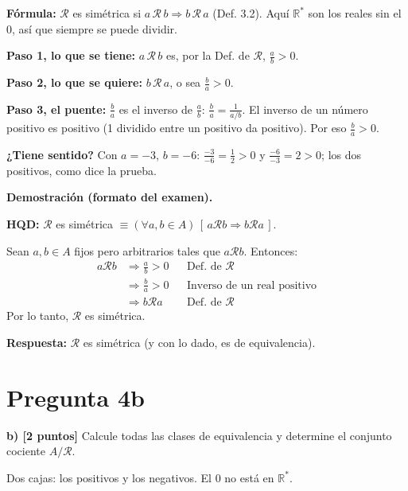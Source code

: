 \documentclass[11pt]{article}
\newcommand{\R}{\mathcal{R}}
\newcommand{\hl}[1]{\colorbox{green!35}{#1}}
\begin{document}
\begin{explica}
\textbf{Fórmula:} $\R$ es simétrica si $a\,\R\,b\Rightarrow b\,\R\,a$ (Def. 3.2). Aquí $\mathbb R^*$ son los reales sin el $0$, así que siempre se puede dividir.

\textbf{Paso 1, lo que se tiene:} $a\,\R\,b$ es, por la Def. de $\R$, $\frac ab>0$.

\textbf{Paso 2, lo que se quiere:} $b\,\R\,a$, o sea $\frac ba>0$.

\textbf{Paso 3, el puente:} $\frac ba$ es el inverso de $\frac ab$: $\frac ba=\frac{1}{a/b}$. El inverso de un número positivo es positivo (1 dividido entre un positivo da positivo). Por eso $\frac ba>0$.

\textbf{¿Tiene sentido?} Con $a=-3$, $b=-6$: $\frac{-3}{-6}=\frac12>0$ y $\frac{-6}{-3}=2>0$; los dos positivos, como dice la prueba.
\end{explica}

\textbf{Demostración (formato del examen).}

\textbf{HQD:} $\R$ es simétrica $\equiv(\forall a,b\in A)\,[\,a\R b\Rightarrow b\R a\,]$.

Sean $a,b\in A$ fijos pero arbitrarios tales que $a\R b$. Entonces:
\begin{align*}
a\R b &\Rightarrow \frac ab>0 && \text{Def. de }\R\\
&\Rightarrow \frac ba>0 && \text{Inverso de un real positivo}\\
&\Rightarrow b\R a && \text{Def. de }\R
\end{align*}
Por lo tanto, $\R$ es simétrica.

\textbf{Respuesta:} $\R$ es simétrica (y con lo dado, es de equivalencia).

\clearpage
\section*{Pregunta 4b}

\textbf{b) [2 puntos]} Calcule todas las \hl{clases de equivalencia} y determine el \hl{conjunto cociente $A/\R$}.

\begin{center}

{\small Dos cajas: los positivos y los negativos. El $0$ no está en $\mathbb R^*$.}
\end{center}
\end{document}
